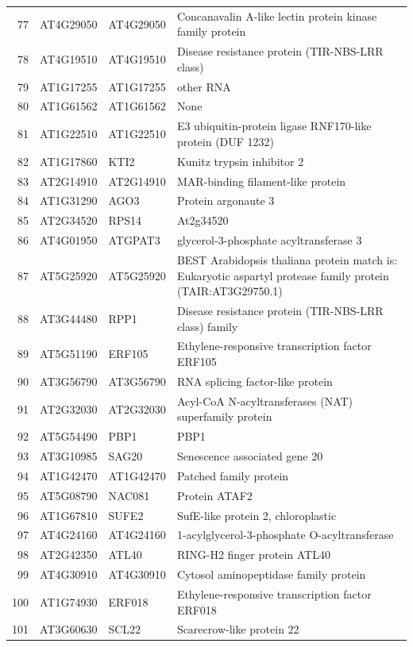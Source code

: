 \documentclass[11pt]{article}
\begin{document}
\begin{center}
\begin{tabular}{rlll}
77 & AT4G29050 & AT4G29050 & Concanavalin A-like lectin protein kinase family protein\\
78 & AT4G19510 & AT4G19510 & Disease resistance protein (TIR-NBS-LRR class)\\
79 & AT1G17255 & AT1G17255 & other RNA\\
80 & AT1G61562 & AT1G61562 & None\\
81 & AT1G22510 & AT1G22510 & E3 ubiquitin-protein ligase RNF170-like protein (DUF 1232)\\
82 & AT1G17860 & KTI2 & Kunitz trypsin inhibitor 2\\
83 & AT2G14910 & AT2G14910 & MAR-binding filament-like protein\\
84 & AT1G31290 & AGO3 & Protein argonaute 3\\
85 & AT2G34520 & RPS14 & At2g34520\\
86 & AT4G01950 & ATGPAT3 & glycerol-3-phosphate acyltransferase 3\\
87 & AT5G25920 & AT5G25920 & BEST Arabidopsis thaliana protein match is: Eukaryotic aspartyl protease family protein (TAIR:AT3G29750.1)\\
88 & AT3G44480 & RPP1 & Disease resistance protein (TIR-NBS-LRR class) family\\
89 & AT5G51190 & ERF105 & Ethylene-responsive transcription factor ERF105\\
90 & AT3G56790 & AT3G56790 & RNA splicing factor-like protein\\
91 & AT2G32030 & AT2G32030 & Acyl-CoA N-acyltransferases (NAT) superfamily protein\\
92 & AT5G54490 & PBP1 & PBP1\\
93 & AT3G10985 & SAG20 & Senescence associated gene 20\\
94 & AT1G42470 & AT1G42470 & Patched family protein\\
95 & AT5G08790 & NAC081 & Protein ATAF2\\
96 & AT1G67810 & SUFE2 & SufE-like protein 2, chloroplastic\\
97 & AT4G24160 & AT4G24160 & 1-acylglycerol-3-phosphate O-acyltransferase\\
98 & AT2G42350 & ATL40 & RING-H2 finger protein ATL40\\
99 & AT4G30910 & AT4G30910 & Cytosol aminopeptidase family protein\\
100 & AT1G74930 & ERF018 & Ethylene-responsive transcription factor ERF018\\
101 & AT3G60630 & SCL22 & Scarecrow-like protein 22\\

\end{tabular}
\end{center}
\end{document}
